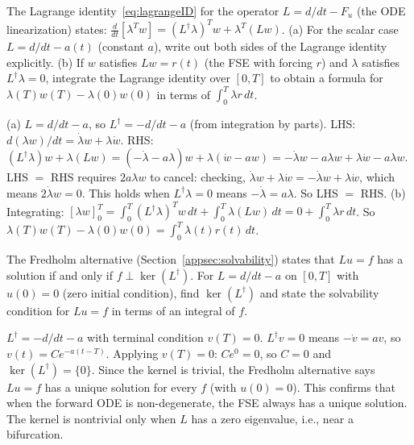 \begin{selfcheck}
The Lagrange identity~\eqref{eq:lagrangeID} for the operator
$L = d/dt - F_u$ (the ODE linearization) states:
$\frac{d}{dt}[\lambda^T w] = (L^\dagger\lambda)^T w + \lambda^T(Lw)$.
(a) For the scalar case $L = d/dt - a(t)$ (constant $a$),
write out both sides of the Lagrange identity explicitly.
(b) If $w$ satisfies $Lw = r(t)$ (the FSE with forcing $r$)
and $\lambda$ satisfies $L^\dagger\lambda = 0$, integrate the
Lagrange identity over $[0,T]$ to obtain a formula for
$\lambda(T)w(T) - \lambda(0)w(0)$ in terms of $\int_0^T \lambda r\,dt$.
\end{selfcheck}
\begin{scAnswer}
(a) $L = d/dt - a$, so $L^\dagger = -d/dt - a$ (from integration by parts).
LHS: $d(\lambda w)/dt = \dot\lambda w + \lambda\dot w$.
RHS: $(L^\dagger\lambda)w + \lambda(Lw) = (-\dot\lambda-a\lambda)w + \lambda(\dot w - aw)
= -\dot\lambda w - a\lambda w + \lambda\dot w - a\lambda w$.
LHS $=$ RHS requires $2a\lambda w$ to cancel: checking, $\dot\lambda w + \lambda\dot w
= -\dot\lambda w + \lambda\dot w$, which means $2\dot\lambda w = 0$. This holds when
$L^\dagger\lambda = 0$ means $-\dot\lambda = a\lambda$. So LHS $=$ RHS. \checkmark
(b) Integrating: $[\lambda w]_0^T = \int_0^T(L^\dagger\lambda)^T w\,dt + \int_0^T\lambda(Lw)\,dt
= 0 + \int_0^T\lambda r\,dt$.
So $\lambda(T)w(T) - \lambda(0)w(0) = \int_0^T\lambda(t)r(t)\,dt$.
\end{scAnswer}

\begin{selfcheck}
The Fredholm alternative (Section~\ref{appsec:solvability}) states that
$Lu = f$ has a solution if and only if $f \perp \ker(L^\dagger)$.
For $L = d/dt - a$ on $[0,T]$ with $u(0) = 0$ (zero initial condition),
find $\ker(L^\dagger)$ and state the solvability condition for $Lu = f$
in terms of an integral of $f$.
\end{selfcheck}
\begin{scAnswer}
$L^\dagger = -d/dt - a$ with terminal condition $v(T) = 0$.
$L^\dagger v = 0$ means $-\dot v = av$, so $v(t) = Ce^{-a(t-T)}$.
Applying $v(T) = 0$: $Ce^0 = 0$, so $C = 0$ and $\ker(L^\dagger) = \{0\}$.
Since the kernel is trivial, the Fredholm alternative says $Lu = f$ has a
unique solution for every $f$ (with $u(0) = 0$). This confirms that
when the forward ODE is non-degenerate, the FSE always has a unique solution.
The kernel is nontrivial only when $L$ has a zero eigenvalue, i.e., near a bifurcation.
\end{scAnswer}

